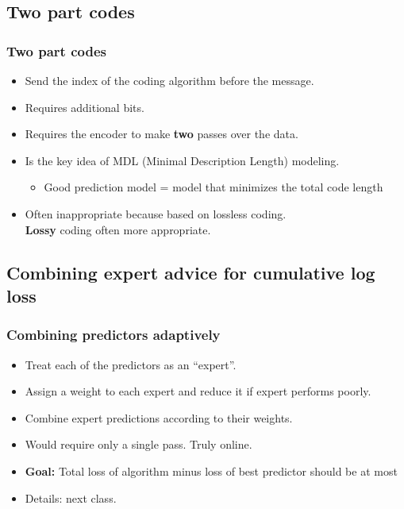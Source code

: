 \documentclass[handout]{beamer}
\newcommand{\R}[1]{{\color{red}{#1}}}
\begin{document}
\subsection{Two part codes}

\begin{frame}
\frametitle{Two part codes}
\begin{itemize}
\item Send the index of the coding algorithm before the message.
\item Requires \R{$\log_2 N$} additional bits.
\item Requires the encoder to make {\bf two} passes over the data.
\item Is the key idea of {\color{blue}MDL} (Minimal Description Length) modeling.
\begin{itemize}
\item Good prediction model = model that minimizes the total code length
\end{itemize}
\item Often inappropriate because based on {\color{blue} lossless} coding. \\
{\bf Lossy} coding often more appropriate.
\end{itemize}
\end{frame}

\subsection{Combining expert advice for cumulative log loss}

\begin{frame}
\frametitle{Combining predictors adaptively}
\begin{itemize}
\item Treat each of the predictors as an ``expert''.
\item Assign a weight to each expert and reduce it if expert performs poorly.
\item Combine expert predictions according to their weights.
\item Would require only a single pass. Truly online.
\item {\bf Goal:} Total loss of algorithm minus loss of best predictor should be at most \R{$\log_2 N$}
\item Details: next class.
\end{itemize}
\end{frame}

\iffalse %

\fi %
\end{document}
